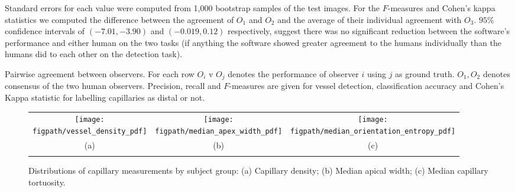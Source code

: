 \documentclass[runningheads,a4paper]{llncs}
\def\figpath{./figs}
\def\figpath{./figs}
\begin{document}
Standard errors for each value were computed from 1,000 bootstrap samples of the test images. For the $F$-measures and Cohen's kappa statistics we computed the difference between the agreement of $O_1$ and $O_2$ and the average of their individual agreement with $O_3$. $95\%$ confidence intervals of $(-7.01,-3.90)$ and $(-0.019,0.12)$ respectively, suggest there was no significant reduction between the software's performance and either human on the two tasks (if anything the software showed greater agreement to the humans individually than the humans did to each other on the detection task).
%
\begin{table}[tb]
\centering

%
\caption{Pairwise agreement between observers. For each row $O_i$ v $O_j$ denotes the performance of observer $i$ using $j$ as ground truth. $O_1,O_2$ denotes consensus of the two human observers. Precision, recall and $F$-measures are given for vessel detection, classification accuracy and Cohen's Kappa statistic for labelling capillaries as distal or not.}
\label{t:results}
\end{table}
%
\begin{figure}[t]
\centering
\begin{tabular}{@{}c c c@{}}
\texttt{[image: \\figpath/vessel\_density\_pdf]} &
\texttt{[image: \\figpath/median\_apex\_width\_pdf]} &
\texttt{[image: \\figpath/median\_orientation\_entropy\_pdf]} \\
(a) & (b) & (c)\\
\noalign{\smallskip}
\end{tabular}
%
\caption{Distributions of capillary measurements by subject group: %
(a) Capillary density; %
(b) Median apical width; %
(c) Median capillary tortuosity.
}
\label{f:subject_apex_measures}
\end{figure}
%


\end{document}
